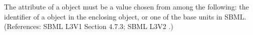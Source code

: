 The  attribute of a \Parameter object must be a value chosen
from among the following: the identifier of a \UnitDefinition object in the
enclosing \Model object, or one of the base units in SBML.  (References:
SBML L3V1 Section 4.7.3; SBML L3V2 .)
